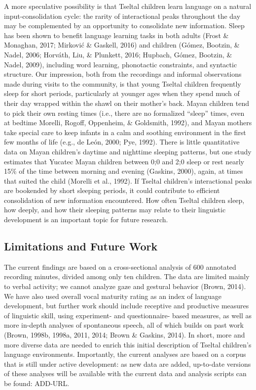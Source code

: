 \documentclass[floatsintext,man]{apa6}
\theoremstyle{definition}
\theoremstyle{definition}
\theoremstyle{definition}
\theoremstyle{remark}
\begin{document}
A more speculative possibility is that Tseltal children learn language
on a natural input-consolidation cycle: the rarity of interactional
peaks throughout the day may be complemented by an opportunity to
consolidate new information. Sleep has been shown to benefit language
learning tasks in both adults (Frost \& Monaghan, 2017; Mirković \&
Gaskell, 2016) and children (Gómez, Bootzin, \& Nadel, 2006; Horváth,
Liu, \& Plunkett, 2016; Hupbach, Gómez, Bootzin, \& Nadel, 2009),
including word learning, phonotactic constraints, and syntactic
structure. Our impression, both from the recordings and informal
observations made during visits to the community, is that young Tseltal
children frequently sleep for short periods, particularly at younger
ages when they spend much of their day wrapped within the shawl on their
mother's back. Mayan children tend to pick their own resting times
(i.e., there are no formalized ``sleep'' times, even at bedtime Morelli,
Rogoff, Oppenheim, \& Goldsmith, 1992), and Mayan mothers take special
care to keep infants in a calm and soothing environment in the first few
months of life (e.g., de León, 2000; Pye, 1992). There is little
quantitative data on Mayan children's daytime and nighttime sleeping
patterns, but one study estimates that Yucatec Mayan children between
0;0 and 2;0 sleep or rest nearly 15\% of the time between morning and
evening (Gaskins, 2000), again, at times that suited the child (Morelli
et al., 1992). If Tseltal children's interactional peaks are bookended
by short sleeping periods, it could contribute to efficient
consolidation of new information encountered. How often Tseltal children
sleep, how deeply, and how their sleeping patterns may relate to their
linguistic development is an important topic for future research.

\subsection{Limitations and Future Work}\label{disc-limfut}

The current findings are based on a cross-sectional analysis of 600
annotated recording minutes, divided among only ten children. The data
are limited mainly to verbal activity; we cannot analyze gaze and
gestural behavior (Brown, 2014). We have also used overall vocal
maturity rating as an index of language development, but further work
should include receptive and productive measures of linguistic skill,
using experiment- and questionnaire- based measures, as well as more
in-depth analyses of spontaneous speech, all of which builds on past
work (Brown, 1998b, 1998a, 2011, 2014; Brown \& Gaskins, 2014). In
short, more and more diverse data are needed to enrich this initial
description of Tseltal children's language environments. Importantly,
the current analyses are based on a corpus that is still under active
development: as new data are added, up-to-date versions of these
analyses will be available with the current data and analysis scripts
can be found: ADD-URL.
\end{document}
